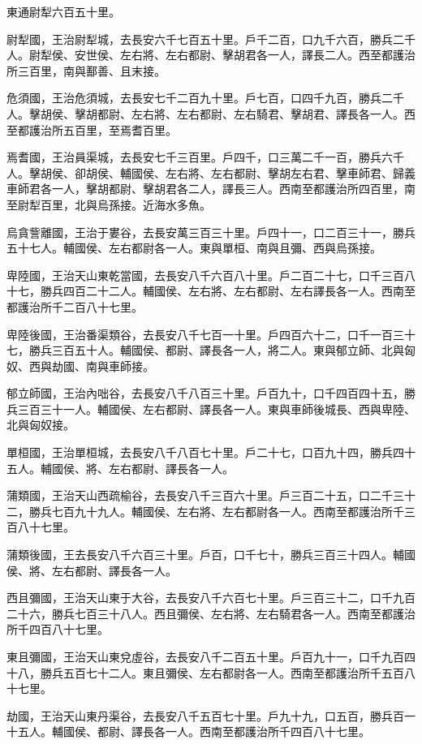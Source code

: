 \begin{pinyinscope}
東通尉犁六百五十里。

尉犁國，王治尉犁城，去長安六千七百五十里。戶千二百，口九千六百，勝兵二千人。尉犁侯、安世侯、左右將、左右都尉、擊胡君各一人，譯長二人。西至都護治所三百里，南與鄯善、且末接。

危須國，王治危須城，去長安七千二百九十里。戶七百，口四千九百，勝兵二千人。擊胡侯、擊胡都尉、左右將、左右都尉、左右騎君、擊胡君、譯長各一人。西至都護治所五百里，至焉耆百里。

焉耆國，王治員渠城，去長安七千三百里。戶四千，口三萬二千一百，勝兵六千人。擊胡侯、卻胡侯、輔國侯、左右將、左右都尉、擊胡左右君、擊車師君、歸義車師君各一人，擊胡都尉、擊胡君各二人，譯長三人。西南至都護治所四百里，南至尉犁百里，北與烏孫接。近海水多魚。

烏貪訾離國，王治于婁谷，去長安萬三百三十里。戶四十一，口二百三十一，勝兵五十七人。輔國侯、左右都尉各一人。東與單桓、南與且彌、西與烏孫接。

卑陸國，王治天山東乾當國，去長安八千六百八十里。戶二百二十七，口千三百八十七，勝兵四百二十二人。輔國侯、左右將、左右都尉、左右譯長各一人。西南至都護治所千二百八十七里。

卑陸後國，王治番渠類谷，去長安八千七百一十里。戶四百六十二，口千一百三十七，勝兵三百五十人。輔國侯、都尉、譯長各一人，將二人。東與郁立師、北與匈奴、西與劫國、南與車師接。

郁立師國，王治內咄谷，去長安八千八百三十里。戶百九十，口千四百四十五，勝兵三百三十一人。輔國侯、左右都尉、譯長各一人。東與車師後城長、西與卑陸、北與匈奴接。

單桓國，王治單桓城，去長安八千八百七十里。戶二十七，口百九十四，勝兵四十五人。輔國侯、將、左右都尉、譯長各一人。

蒲類國，王治天山西疏榆谷，去長安八千三百六十里。戶三百二十五，口二千三十二，勝兵七百九十九人。輔國侯、左右將、左右都尉各一人。西南至都護治所千三百八十七里。

蒲類後國，王去長安八千六百三十里。戶百，口千七十，勝兵三百三十四人。輔國侯、將、左右都尉、譯長各一人。

西且彌國，王治天山東于大谷，去長安八千六百七十里。戶三百三十二，口千九百二十六，勝兵七百三十八人。西且彌侯、左右將、左右騎君各一人。西南至都護治所千四百八十七里。

東且彌國，王治天山東兌虛谷，去長安八千二百五十里。戶百九十一，口千九百四十八，勝兵五百七十二人。東且彌侯、左右都尉各一人。西南至都護治所千五百八十七里。

劫國，王治天山東丹渠谷，去長安八千五百七十里。戶九十九，口五百，勝兵百一十五人。輔國侯、都尉、譯長各一人。西南至都護治所千四百八十七里。


\end{pinyinscope}
